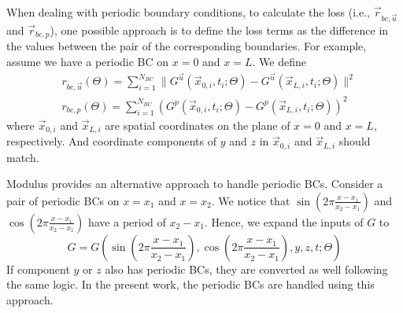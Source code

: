 
When dealing with periodic boundary conditions, to calculate the loss (i.e., $\vec{r}_{bc,\vec{u}}$ and $\vec{r}_{bc, p}$), one possible approach is to define the loss terms as the difference in the values between the pair of the corresponding boundaries.
For example, assume we have a periodic BC on $x=0$ and $x=L$.
We define
\begin{equation}\label{eq:naive-periodic-bc}
    \begin{aligned}
    &r_{bc,\vec{u}}(\Theta) = \sum\limits_{i=1}^{N_{BC}} \lVert G^{\vec{u}}(\vec{x}_{0,i}, t_i; \Theta) - G^{\vec{u}}(\vec{x}_{L,i}, t_i; \Theta) \rVert^2\\
    &r_{bc,p}(\Theta) = \sum\limits_{i=1}^{N_{BC}} ( G^{p}(\vec{x}_{0,i}, t_i; \Theta) - G^{p}(\vec{x}_{L,i}, t_i; \Theta) )^2
    \end{aligned}
\end{equation}
where $\vec{x}_{0,i}$ and $\vec{x}_{L,i}$ are spatial coordinates on the plane of $x=0$ and $x=L$, respectively.
And coordinate components of $y$ and $z$ in $\vec{x}_{0,i}$ and $\vec{x}_{L,i}$ should match.

Modulus provides an alternative approach to handle periodic BCs.
Consider a pair of periodic BCs on $x=x_1$ and $x=x_2$.
We notice that $\sin(2\pi\frac{x-x_1}{x_2-x_1})$ and  $\cos(2\pi\frac{x-x_1}{x_2-x_1})$ have a period of $x_2-x_1$.
Hence, we expand the inputs of $G$ to
\begin{equation}\label{eq:periodic-G}
    G = G(\sin(2\pi\frac{x-x_1}{x_2-x_1}), \cos(2\pi\frac{x-x_1}{x_2-x_1}), y, z, t; \Theta)
\end{equation}
If component $y$ or $z$ also has periodic BCs, they are converted as well following the same logic.
In the present work, the periodic BCs are handled using this approach.
